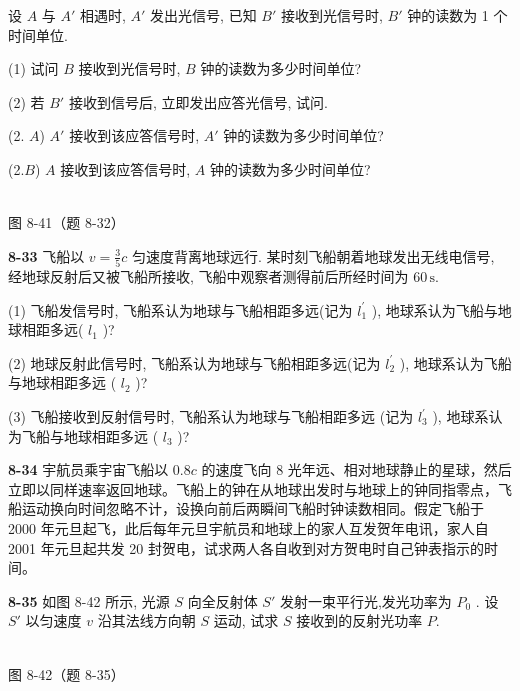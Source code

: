 设 $A$ 与 $A'$ 相遇时, $A'$ 发出光信号, 已知 $B'$ 接收到光信号时, $B'$ 钟的读数为 1 个时间单位.

(1) 试问 $B$ 接收到光信号时, $B$ 钟的读数为多少时间单位?

(2) 若 $B'$ 接收到信号后, 立即发出应答光信号, 试问.

(2. $A$) $A'$ 接收到该应答信号时, $A'$ 钟的读数为多少时间单位?

(2.$B$) $A$ 接收到该应答信号时, $A$ 钟的读数为多少时间单位?

\begin{center}
\resizebox{0.50\textwidth}{!}{}\\[4pt]
{\small 图 8-41（题 8-32）}
\end{center}

\newpage

\textbf{8-33} 飞船以 $v=\frac{3}{5}c$ 匀速度背离地球远行. 某时刻飞船朝着地球发出无线电信号, 经地球反射后又被飞船所接收, 飞船中观察者测得前后所经时间为 $60\,\mathrm s$.

(1) 飞船发信号时, 飞船系认为地球与飞船相距多远(记为 $l_{1}^{\prime}$ ), 地球系认为飞船与地球相距多远( $l_{1}$ )?

(2) 地球反射此信号时, 飞船系认为地球与飞船相距多远(记为 $l_{2}^{\prime}$ ), 地球系认为飞船与地球相距多远 ( $l_{2}$ )?

(3) 飞船接收到反射信号时, 飞船系认为地球与飞船相距多远 (记为 $l_{3}^{\prime}$ ), 地球系认为飞船与地球相距多远 ( $l_{3}$ )?

\newpage

\textbf{8-34} 宇航员乘宇宙飞船以 $0.8c$ 的速度飞向 8 光年远、相对地球静止的星球，然后立即以同样速率返回地球。飞船上的钟在从地球出发时与地球上的钟同指零点，飞船运动换向时间忽略不计，设换向前后两瞬间飞船时钟读数相同。假定飞船于 2000 年元旦起飞，此后每年元旦宇航员和地球上的家人互发贺年电讯，家人自 2001 年元旦起共发 20 封贺电，试求两人各自收到对方贺电时自己钟表指示的时间。

\newpage

\textbf{8-35} 如图 8-42 所示, 光源 $S$ 向全反射体 $S'$ 发射一束平行光,发光功率为 $P_{0}$ . 设 $S'$ 以匀速度 $v$ 沿其法线方向朝 $S$ 运动, 试求 $S$ 接收到的反射光功率 $P$.

\begin{center}
\resizebox{0.50\textwidth}{!}{}\\[4pt]
{\small 图 8-42（题 8-35）}
\end{center}

